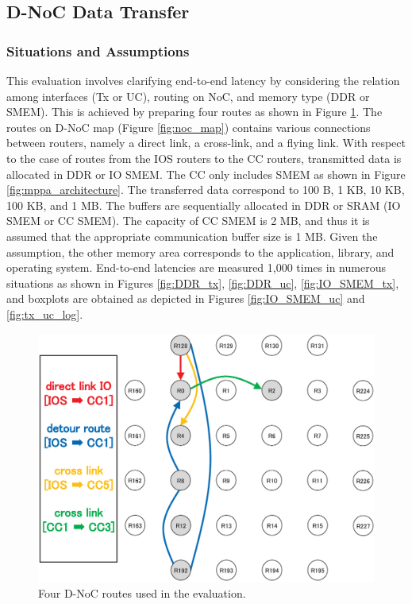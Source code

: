 \documentclass[conference,compsoc]{IEEEtran}
\begin{document}
\vspace{-3mm}
\subsection{D-NoC Data Transfer}
\label{sec:dnoc_eval}

\vspace{-3mm}
\subsubsection{Situations and Assumptions}
\label{sec:situations_and_assumptions}

This evaluation involves clarifying end-to-end latency by considering the relation among interfaces (Tx or UC), routing on NoC, and memory type (DDR or SMEM).
This is achieved by preparing four routes as shown in Figure \ref{fig:noc_routes}.
The routes on D-NoC map (Figure \ref{fig:noc_map}) contains various connections between routers, namely a direct link, a cross-link, and a flying link.
With respect to the case of routes from the IOS routers to the CC routers, transmitted data is allocated in DDR or IO SMEM.
The CC only includes SMEM as shown in Figure \ref{fig:mppa_architecture}.
The transferred data correspond to 100 B, 1 KB, 10 KB, 100 KB, and 1 MB.
The buffers are sequentially allocated in DDR or SRAM (IO SMEM or CC SMEM).
The capacity of CC SMEM is 2 MB, and thus it is assumed that the appropriate communication buffer size is 1 MB.
Given the assumption, the other memory area corresponds to the application, library, and operating system.
End-to-end latencies are measured 1,000 times in numerous situations as shown in Figures \ref{fig:DDR_tx}, \ref{fig:DDR_uc}, \ref{fig:IO_SMEM_tx}, and boxplots are obtained as depicted in Figures \ref{fig:IO_SMEM_uc} and \ref{fig:tx_uc_log}.

\begin{figure}[t]
  \centering
  \includegraphics[width=0.8\linewidth]{../figure/noc_routes.eps}
  \vspace{-3mm}
  \caption{\label{fig:noc_routes}
    Four D-NoC routes used in the evaluation.}
  \vspace{-5mm}
\end{figure}
\end{document}
